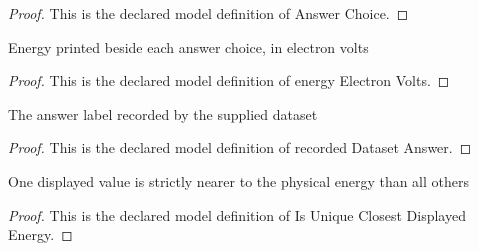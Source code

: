\begin{proof}
  This is the declared model definition of Answer Choice.
\end{proof}
\begin{definition}
  \label{def:physics:phyx-mini-0620:phyxminiproblems-problemphyxmini0620-answerchoice-energyelectronvolts}
  Energy printed beside each answer choice, in electron volts
\end{definition}
\begin{proof}
  This is the declared model definition of energy Electron Volts.
\end{proof}
\begin{definition}
  \label{def:physics:phyx-mini-0620:phyxminiproblems-problemphyxmini0620-recordeddatasetanswer}
  The answer label recorded by the supplied dataset
\end{definition}
\begin{proof}
  This is the declared model definition of recorded Dataset Answer.
\end{proof}
\begin{definition}
  \label{def:physics:phyx-mini-0620:phyxminiproblems-problemphyxmini0620-isuniqueclosestdisplayedenergy}
  One displayed value is strictly nearer to the physical energy than all others
\end{definition}
\begin{proof}
  This is the declared model definition of Is Unique Closest Displayed Energy.
\end{proof}

